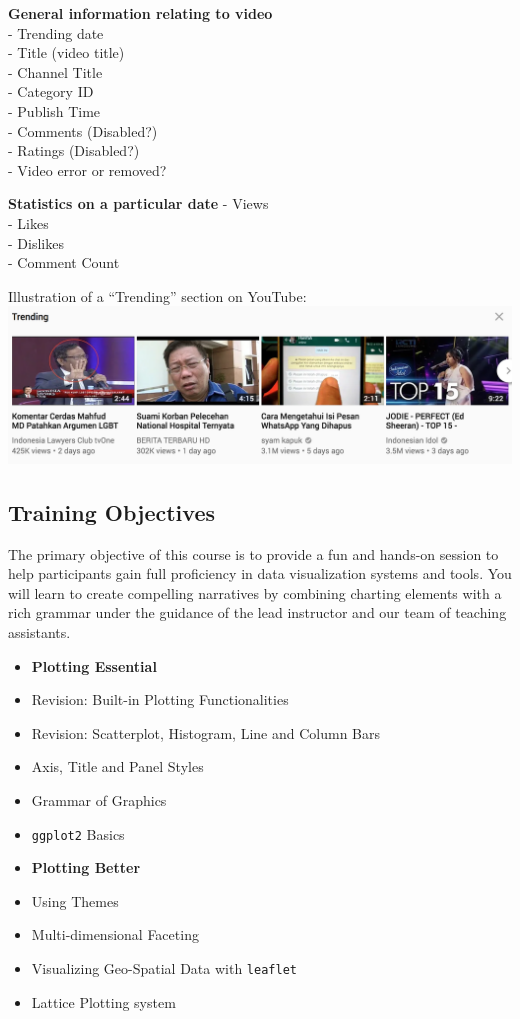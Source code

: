 \documentclass[]{article}
\begin{document}
\textbf{General information relating to video}\\
- Trending date\\
- Title (video title)\\
- Channel Title\\
- Category ID\\
- Publish Time\\
- Comments (Disabled?)\\
- Ratings (Disabled?)\\
- Video error or removed?

\textbf{Statistics on a particular date} - Views\\
- Likes\\
- Dislikes\\
- Comment Count

Illustration of a ``Trending'' section on YouTube:
\includegraphics{trending.png}

\hypertarget{training-objectives}{%
\subsection{Training Objectives}\label{training-objectives}}

The primary objective of this course is to provide a fun and hands-on
session to help participants gain full proficiency in data visualization
systems and tools. You will learn to create compelling narratives by
combining charting elements with a rich grammar under the guidance of
the lead instructor and our team of teaching assistants.

\begin{itemize}
\item
  \textbf{Plotting Essential}
\item
  Revision: Built-in Plotting Functionalities\\
\item
  Revision: Scatterplot, Histogram, Line and Column Bars\\
\item
  Axis, Title and Panel Styles\\
\item
  Grammar of Graphics\\
\item
  \texttt{ggplot2} Basics
\item
  \textbf{Plotting Better}\\
\item
  Using Themes\\
\item
  Multi-dimensional Faceting\\
\item
  Visualizing Geo-Spatial Data with \texttt{leaflet}
\item
  Lattice Plotting system
\end{itemize}
\end{document}
